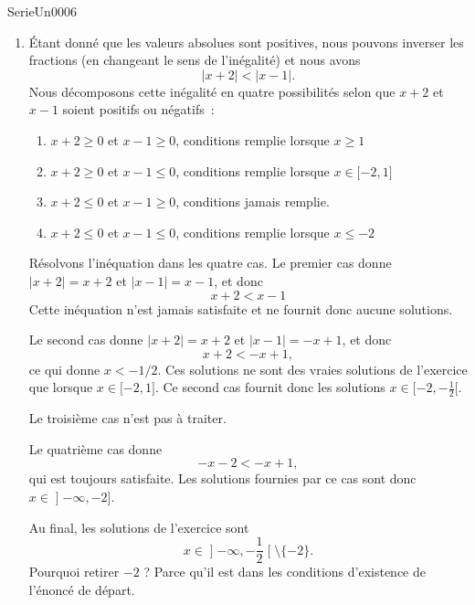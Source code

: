 \documentclass{article}
\begin{document}
\begin{corrige}{SerieUn0006}
\begin{enumerate}
		\item
			Étant donné que les valeurs absolues sont positives, nous pouvons inverser les fractions (en changeant le sens de l'inégalité) et nous avons
			\begin{equation}
				| x+2 |<| x-1 |.
			\end{equation}
			Nous décomposons cette inégalité en quatre possibilités selon que $x+2$ et $x-1$ soient positifs ou négatifs~:
			\begin{enumerate}
				\item $x+2\geq0$ et $x-1\geq0$, conditions remplie lorsque $x\geq 1$
				\item $x+2\geq0$ et $x-1\leq0$, conditions remplie lorsque $x\in\mathopen[ -2 , 1 \mathclose]$
				\item $x+2\leq0$ et $x-1\geq0$, conditions jamais remplie.
				\item $x+2\leq0$ et $x-1\leq0$, conditions remplie lorsque $x\leq-2$
			\end{enumerate}
			Résolvons l'inéquation dans les quatre cas. Le premier cas donne $| x+2 |=x+2$ et $| x-1 |=x-1$, et donc
			\begin{equation}
				x+2<x-1
			\end{equation}
			Cette inéquation n'est jamais satisfaite et ne fournit donc aucune solutions.

			Le second cas donne $| x+2 |=x+2$ et $| x-1 |=-x+1$, et donc
			\begin{equation}
				x+2<-x+1,
			\end{equation}
			ce qui donne $x<-1/2$. Ces solutions ne sont des vraies solutions de l'exercice que lorsque $x\in\mathopen[ -2 , 1 \mathclose]$. Ce second cas fournit donc les solutions $x\in\mathopen[ -2 , -\frac{1}{ 2 } [$.

			Le troisième cas n'est pas à traiter.

			Le quatrième cas donne
			\begin{equation}
				-x-2<-x+1,
			\end{equation}
			qui est toujours satisfaite. Les solutions fournies par ce cas sont donc $x\in\mathopen] -\infty , -2 \mathclose]$.

			Au final, les solutions de l'exercice sont
			\begin{equation}
				x\in\mathopen] -\infty , -\frac{ 1 }{ 2 } \mathclose[\setminus\{ -2 \}.
			\end{equation}
			Pourquoi retirer $-2$ ? Parce qu'il est dans les conditions d'existence de l'énoncé de départ.



\end{enumerate}
\end{corrige}
\end{document}
